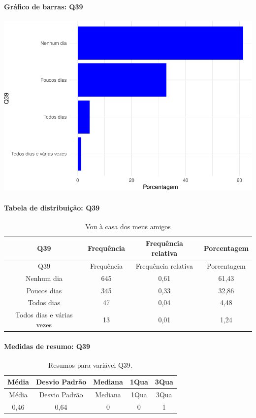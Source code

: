 \documentclass[]{article}
\let\oldparagraph\paragraph
\renewcommand{\paragraph}[1]{\oldparagraph{#1}\mbox{}}
\begin{document}
\hypertarget{gruxe1fico-de-barras-q39}{%
\paragraph{Gráfico de barras: Q39}\label{gruxe1fico-de-barras-q39}}

\begin{center}\includegraphics[width=0.75\linewidth]{relatorio_covid19_files/figure-latex/unnamed-chunk-1485-1} \end{center}

\hypertarget{tabela-de-distribuiuxe7uxe3o-q39}{%
\paragraph{Tabela de distribuição: Q39}\label{tabela-de-distribuiuxe7uxe3o-q39}}

\begin{longtable}[]{@{}cccc@{}}
\caption{\label{tab:unnamed-chunk-1486}Vou à casa dos meus amigos}\tabularnewline
\toprule
Q39 & Frequência & Frequência relativa & Porcentagem\tabularnewline
\midrule
\endfirsthead
\toprule
Q39 & Frequência & Frequência relativa & Porcentagem\tabularnewline
\midrule
\endhead
Nenhum dia & 645 & 0,61 & 61,43\tabularnewline
Poucos dias & 345 & 0,33 & 32,86\tabularnewline
Todos dias & 47 & 0,04 & 4,48\tabularnewline
Todos dias e várias vezes & 13 & 0,01 & 1,24\tabularnewline
\bottomrule
\end{longtable}

\hypertarget{medidas-de-resumo-q39}{%
\paragraph{Medidas de resumo: Q39}\label{medidas-de-resumo-q39}}

\begin{longtable}[]{@{}ccccc@{}}
\caption{\label{tab:unnamed-chunk-1487}Resumos para variável Q39.}\tabularnewline
\toprule
Média & Desvio Padrão & Mediana & 1Qua & 3Qua\tabularnewline
\midrule
\endfirsthead
\toprule
Média & Desvio Padrão & Mediana & 1Qua & 3Qua\tabularnewline
\midrule
\endhead
0,46 & 0,64 & 0 & 0 & 1\tabularnewline
\bottomrule
\end{longtable}
\end{document}
